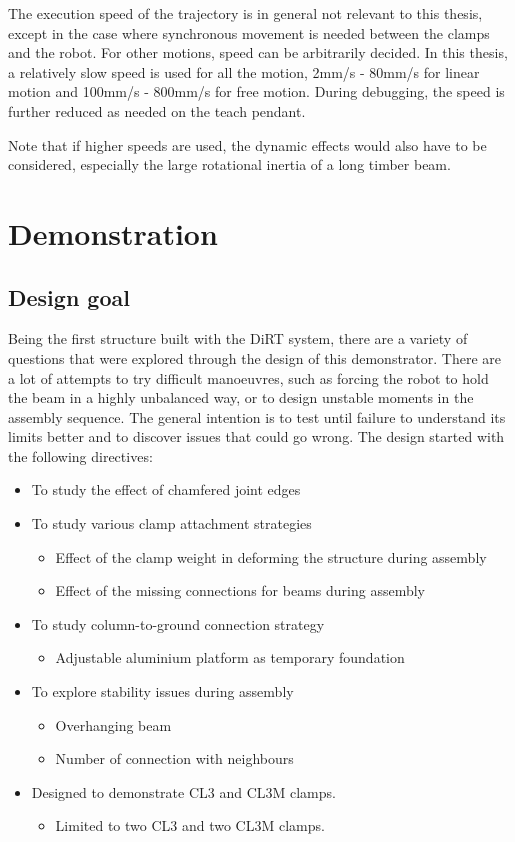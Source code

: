 \begin{itemize}
\begin{enumerate}
The execution speed of the trajectory is in general not relevant to this thesis, except in the case where synchronous movement is needed between the clamps and the robot. For other motions, speed can be arbitrarily decided. In this thesis, a relatively slow speed is used for all the motion, 2mm/s - 80mm/s for linear motion and 100mm/s - 800mm/s for free motion. During debugging, the speed is further reduced as needed on the teach pendant. 

Note that if higher speeds are used, the dynamic effects would also have to be considered, especially the large rotational inertia of a long timber beam.

\section{Demonstration}
\subsection{Design goal}

Being the first structure built with the DiRT system, there are a variety of questions that were explored through the design of this demonstrator. There are a lot of attempts to try difficult manoeuvres, such as forcing the robot to hold the beam in a highly unbalanced way, or to design unstable moments in the assembly sequence. The general intention is to test until failure to understand its limits better and to discover issues that could go wrong. The design started with the following directives:
\begin{itemize}
\item To study the effect of chamfered joint edges
\item To study various clamp attachment strategies
    \begin{itemize}
        \item Effect of the clamp weight in deforming the structure during assembly
        \item Effect of the missing connections for beams during assembly
    \end{itemize}
\item To study column-to-ground connection strategy
    \begin{itemize}
    \item Adjustable aluminium platform as temporary foundation
    \end{itemize}
\item To explore stability issues during assembly
    \begin{itemize}
    \item Overhanging beam
    \item Number of connection with neighbours
    \end{itemize}
\item Designed to demonstrate CL3 and CL3M clamps.
    \begin{itemize}
    \item Limited to two CL3 and two CL3M clamps.
    \end{itemize}
\end{itemize}


\end{enumerate}
\end{itemize}
